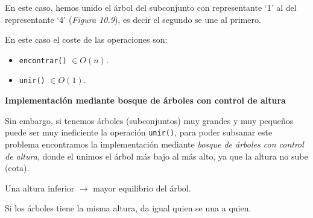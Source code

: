 En este caso, hemos unido el árbol del subconjunto con representante `1' al del representante `4' (\textit{Figura 10.9}), es decir el segundo se une al primero.

En este caso el coste de las operaciones son:
\begin{itemize}
  \item \texttt{encontrar()} \(\in O(n)\).
  \item \texttt{unir()} \(\in O(1)\).
\end{itemize}
\newpage
\textbf{Implementación mediante bosque de árboles con control de altura}

Sin embargo, si tenemos árboles (subconjuntos) muy grandes y muy pequeños puede ser muy ineficiente la operación \texttt{unir()}, para poder subsanar este problema encontramos la implementación mediante \textit{bosque de árboles con control de altura}, donde el unimos el árbol más bajo al más alto, ya que la altura no sube (cota).

Una altura inferior \(\rightarrow\) mayor equilibrio del árbol.

Si los árboles tiene la misma altura, da igual quien se una a quien.


